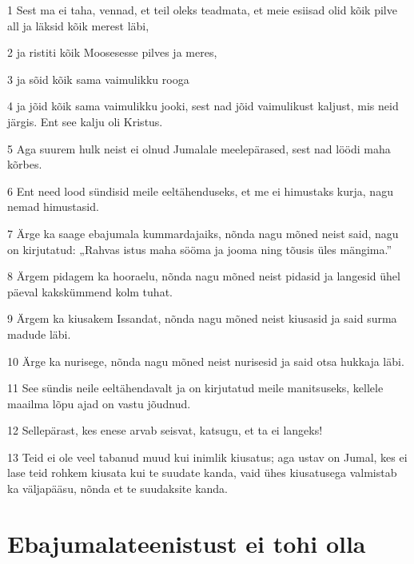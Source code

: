 \par 1 Sest ma ei taha, vennad, et teil oleks teadmata, et meie esiisad olid kõik pilve all ja läksid kõik merest läbi,
\par 2 ja ristiti kõik Moosesesse pilves ja meres,
\par 3 ja sõid kõik sama vaimulikku rooga
\par 4 ja jõid kõik sama vaimulikku jooki, sest nad jõid vaimulikust kaljust, mis neid järgis. Ent see kalju oli Kristus.
\par 5 Aga suurem hulk neist ei olnud Jumalale meelepärased, sest nad löödi maha kõrbes.
\par 6 Ent need lood sündisid meile eeltähenduseks, et me ei himustaks kurja, nagu nemad himustasid.
\par 7 Ärge ka saage ebajumala kummardajaiks, nõnda nagu mõned neist said, nagu on kirjutatud: „Rahvas istus maha sööma ja jooma ning tõusis üles mängima.”
\par 8 Ärgem pidagem ka hooraelu, nõnda nagu mõned neist pidasid ja langesid ühel päeval kakskümmend kolm tuhat.
\par 9 Ärgem ka kiusakem Issandat, nõnda nagu mõned neist kiusasid ja said surma madude läbi.
\par 10 Ärge ka nurisege, nõnda nagu mõned neist nurisesid ja said otsa hukkaja läbi.
\par 11 See sündis neile eeltähendavalt ja on kirjutatud meile manitsuseks, kellele maailma lõpu ajad on vastu jõudnud.
\par 12 Sellepärast, kes enese arvab seisvat, katsugu, et ta ei langeks!
\par 13 Teid ei ole veel tabanud muud kui inimlik kiusatus; aga ustav on Jumal, kes ei lase teid rohkem kiusata kui te suudate kanda, vaid ühes kiusatusega valmistab ka väljapääsu, nõnda et te suudaksite kanda.

\section*{Ebajumalateenistust ei tohi olla}

